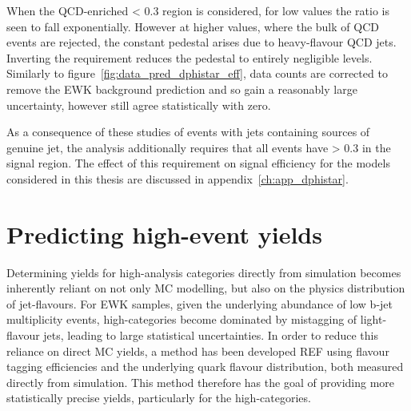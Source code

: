 When the QCD-enriched \mindphistar < 0.3 region is considered, for low \alphat
values the ratio \rmhtmet is seen to fall exponentially. However at
higher \alphat values, where the bulk of QCD events are rejected, the
constant pedestal arises due to heavy-flavour QCD jets. Inverting
the \mindphistar requirement reduces the pedestal to entirely negligible
levels. Similarly to figure~\ref{fig:data_pred_dphistar_eff}, data counts are
corrected to remove the EWK background prediction and so gain a reasonably
large uncertainty, however still agree statistically with zero.

As a consequence of these studies of events with jets containing sources of
genuine \met jet, the analysis
additionally requires that all events have \mindphistar > 0.3 in the signal
region. The effect of this requirement on signal efficiency for the models 
considered in this thesis are discussed in appendix~\ref{ch:app_dphistar}.


\section{Predicting high-\nb event yields}
\label{sec:formula_method}

Determining yields for high-\nb analysis categories directly from simulation
becomes
inherently reliant on not only MC modelling, but also on the physics
distribution of jet-flavours. For EWK samples, given the underlying abundance of
low b-jet multiplicity events, high-\nb categories become dominated by
mistagging of light-flavour jets, leading to large statistical uncertainties.
In order to reduce this reliance on direct MC yields, a method has been
developed REF using flavour tagging efficiencies and the underlying quark
flavour distribution, both measured directly from simulation. This method
therefore has the goal of providing more statistically precise yields,
particularly for the high-\nb categories.

